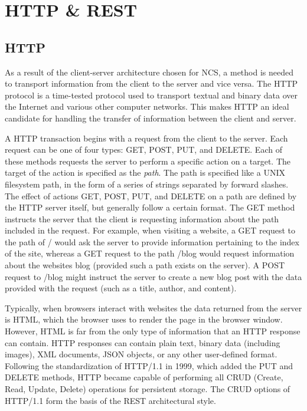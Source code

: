 \section{HTTP \& REST}

\subsection{HTTP}

As a result of the client-server architecture chosen for NCS, a method is needed to transport information from the client to the server and vice versa. The HTTP protocol is a time-tested protocol used to transport textual and binary data over the Internet and various other computer networks. This makes HTTP an ideal candidate for handling the transfer of information between the client and server.

A HTTP transaction begins with a request from the client to the server. Each request can be one of four types: GET, POST, PUT, and DELETE. Each of these methods requests the server to perform a specific action on a target. The target of the action is specified as the \emph{path}. The path is specified like a UNIX filesystem path, in the form of a series of strings separated by forward slashes. The effect of actions GET, POST, PUT, and DELETE on a path are defined by the HTTP server itself, but generally follow a certain format\cite{fielding1999hypertext}. The GET method instructs the server that the client is requesting information about the path included in the request. For example, when visiting a website, a GET request to the path of / would ask the server to provide information pertaining to the index of the site, whereas a GET request to the path /blog would request information about the websites blog (provided such a path exists on the server). A POST request to /blog might instruct the server to create a new blog post with the data provided with the request (such as a title, author, and content).

Typically, when browsers interact with websites the data returned from the server is HTML, which the browser uses to render the page in the browser window. However, HTML is far from the only type of information that an HTTP response can contain. HTTP responses can contain plain text, binary data (including images), XML documents, JSON objects, or any other user-defined format. Following the standardization of HTTP/1.1 in 1999, which added the PUT and DELETE methods, HTTP became capable of performing all CRUD (Create, Read, Update, Delete) operations for persistent storage\cite{fielding1999hypertext}. The CRUD options of HTTP/1.1 form the basis of the REST architectural style\cite{fielding2000representational}.

